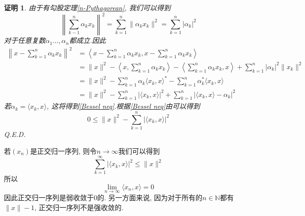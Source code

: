\documentclass[a4paper,11pt]{article}
\theoremstyle{mystyle}
\newtheorem{Proof}{\hspace{2em}证明}[section]
\begin{document}
\begin{Proof}
  由于有勾股定理\eqref{n-Pythagorean}, 我们可以得到
  \begin{equation*}
    \left\|\sum_{k-1}^{n}\alpha_k x_k\right\|^2=\sum_{k=1}^{n}\|\alpha_k x_k\|^2=\sum_{k=1}^{n}|\alpha_k|^2
  \end{equation*}
  对于任意复数$\alpha_1\dots,\alpha_n$都成立.因此
  \begin{equation*}
  \begin{split}
     \left\|x-\sum_{k=1}^{n}\alpha_k x_k\right\|^2&=\left\langle x-\sum_{k=1}^{n}\alpha_kx_k,x-\sum_{k=1}^{n}\alpha_kx_k\right\rangle \\
       &=\|x\|^2-\left\langle x,\sum_{k=1}^{n}\alpha_kx_k\right\rangle-\left\langle\sum_{k=1}^{n}\alpha_kx_k,x\right\rangle+\sum_{k=1}^{n}|\alpha_k|^2\|x_k\|^2 \\
       &=\|x\|^2-\sum_{k=1}^{n}\alpha_k\langle x_k,x\rangle^*-\sum_{k=1}^{n}\alpha_k^*\langle x_k,x\rangle \\
       &=\|x\|^2-\sum_{k=1}^{n}|\langle x_k,x\rangle|^2+\sum_{k=1}^{n}|\langle x_k,x\rangle-\alpha_k|^2
  \end{split}
  \end{equation*}
  若$\alpha_k=\langle x_k,x\rangle$, 这将得到\eqref{Bessel neq}.根据\eqref{Bessel neq}由可以得到
  \begin{equation*}
    0\leq\|x\|^2-\sum_{k=1}^{n}|\langle x_k,x\rangle|^2
  \end{equation*}
  Q.E.D.
\end{Proof}
若$(x_n)$是正交归一序列, 则令$n\to \infty$我们可以得到
\begin{equation}\label{Bessel neq infty}
  \sum_{k=1}^{\infty}|\langle x_k,x\rangle|^2\leq\|x\|^2
\end{equation}
所以
\begin{equation*}
  \lim_{n\to\infty}\langle x_n,x\rangle=0
\end{equation*}
因此正交归一序列是弱收敛于$0$的. 另一方面来说, 因为对于所有的$n\in \mathbb{N}$都有$\|x\|-1$, 正交归一序列不是强收敛的.
\end{document}
